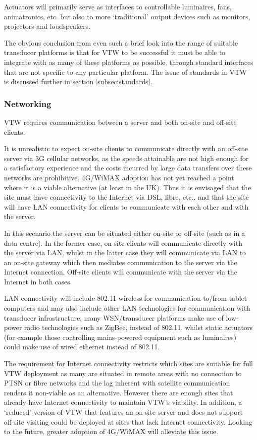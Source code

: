 \documentclass{sig-alternate}
\begin{document}
{Actuators will primarily serve as interfaces to controllable luminaires, fans, animatronics, etc. but also to more `traditional' output devices such as monitors, projectors and loudspeakers.

The obvious conclusion from even such a brief look into the range of suitable transducer platforms is that for VTW to be successful it must be able to integrate with as many of these platforms as possible, through standard interfaces that are not specific to any particular platform. The issue of standards in VTW is discussed further in section \ref{subsec:standards}.

\subsubsection{Networking}
VTW requires communication between a server and both on-site and off-site clients.

It is unrealistic to expect on-site clients to communicate directly with an off-site server via 3G cellular networks, as the speeds attainable are not high enough for a satisfactory experience and the costs incurred by large data transfers over these networks are prohibitive. 4G/WiMAX adoption has not yet reached a point where it is a viable alternative (at least in the UK). Thus it is envisaged that the site must have connectivity to the Internet via DSL, fibre, etc., and that the site will have LAN connectivity for clients to communicate with each other and with the server.

In this scenario the server can be situated either on-site or off-site (such as in a data centre). In the former case, on-site clients will communicate directly with the server via LAN, whilst in the latter case they will communicate via LAN to an on-site gateway which then mediates communication to the server via the Internet connection. Off-site clients will communicate with the server via the Internet in both cases.

LAN connectivity will include 802.11 wireless for communication to/from tablet computers and may also include other LAN technologies for communication with transducer infrastructure; many WSN/transducer platforms make use of low-power radio technologies such as ZigBee, instead of 802.11, whilst static actuators (for example those controlling mains-powered equipment such as luminaires) could make use of wired ethernet instead of 802.11.

The requirement for Internet connectivity restricts which sites are suitable for full VTW deployment as many are situated in remote areas with no connection to PTSN or fibre networks and the lag inherent with satellite communication renders it non-viable as an alternative. However there are enough sites that already have Internet connectivity to maintain VTW's viability. In addition, a `reduced' version of VTW that features an on-site server and does not support off-site visiting could be deployed at sites that lack Internet connectivity. Looking to the future, greater adoption of 4G/WiMAX will alleviate this issue.

}
\end{document}
